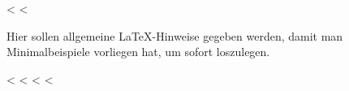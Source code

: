 \documentclass[
  numbers=autoendperiod,
  a4paper,  %
  twoside,  %
  bibliography=totoc,
  headsepline,
  cleardoublepage=empty,
  parskip=half,
  draft=false
]{scrbook}
\begin{document}
<%
<%
\label{chap:latexhints}

Hier sollen allgemeine \LaTeX-Hinweise gegeben werden, damit man Minimalbeispiele vorliegen hat, um sofort loszulegen.

<%
<%
<%
<%
\end{document}
